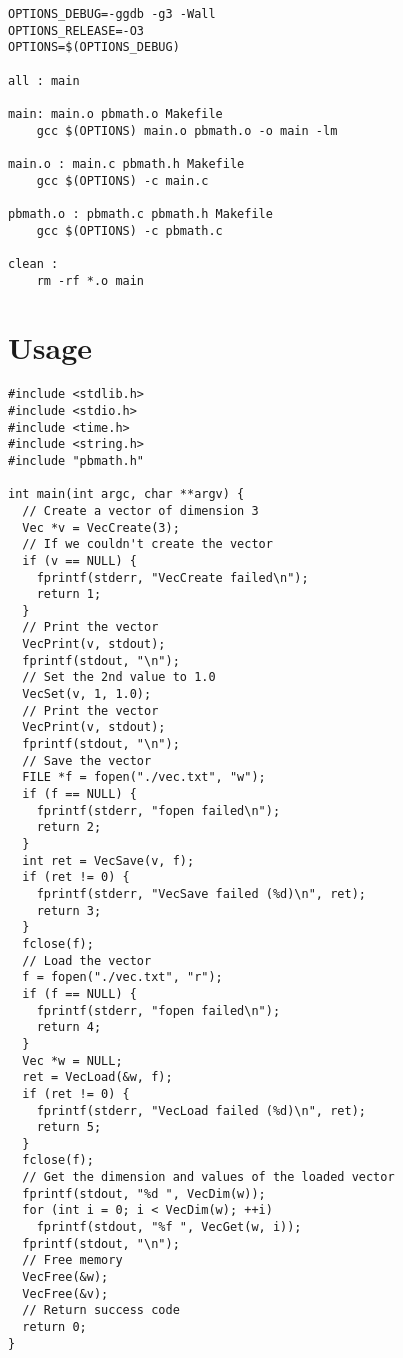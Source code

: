 \documentclass[12pt, a4paper]{article}
\begin{document}
\begin{scriptsize}
\begin{ttfamily}
\begin{lstlisting}
OPTIONS_DEBUG=-ggdb -g3 -Wall
OPTIONS_RELEASE=-O3 
OPTIONS=$(OPTIONS_DEBUG)

all : main

main: main.o pbmath.o Makefile 
	gcc $(OPTIONS) main.o pbmath.o -o main -lm

main.o : main.c pbmath.h Makefile
	gcc $(OPTIONS) -c main.c

pbmath.o : pbmath.c pbmath.h Makefile
	gcc $(OPTIONS) -c pbmath.c

clean : 
	rm -rf *.o main
\end{lstlisting}
\end{ttfamily}
\end{scriptsize}

\section{Usage}

\begin{scriptsize}
\begin{ttfamily}
\begin{lstlisting}
#include <stdlib.h>
#include <stdio.h>
#include <time.h>
#include <string.h>
#include "pbmath.h"

int main(int argc, char **argv) {
  // Create a vector of dimension 3
  Vec *v = VecCreate(3);
  // If we couldn't create the vector
  if (v == NULL) {
    fprintf(stderr, "VecCreate failed\n");
    return 1;
  }
  // Print the vector
  VecPrint(v, stdout);
  fprintf(stdout, "\n");
  // Set the 2nd value to 1.0
  VecSet(v, 1, 1.0);
  // Print the vector
  VecPrint(v, stdout);
  fprintf(stdout, "\n");
  // Save the vector
  FILE *f = fopen("./vec.txt", "w");
  if (f == NULL) {
    fprintf(stderr, "fopen failed\n");
    return 2;
  }
  int ret = VecSave(v, f);
  if (ret != 0) {
    fprintf(stderr, "VecSave failed (%d)\n", ret);
    return 3;
  }
  fclose(f);
  // Load the vector
  f = fopen("./vec.txt", "r");
  if (f == NULL) {
    fprintf(stderr, "fopen failed\n");
    return 4;
  }
  Vec *w = NULL;
  ret = VecLoad(&w, f);
  if (ret != 0) {
    fprintf(stderr, "VecLoad failed (%d)\n", ret);
    return 5;
  }
  fclose(f);
  // Get the dimension and values of the loaded vector
  fprintf(stdout, "%d ", VecDim(w));
  for (int i = 0; i < VecDim(w); ++i)
    fprintf(stdout, "%f ", VecGet(w, i));
  fprintf(stdout, "\n");
  // Free memory
  VecFree(&w);
  VecFree(&v);
  // Return success code
  return 0;
}
\end{lstlisting}
\end{ttfamily}
\end{scriptsize}
\end{document}
